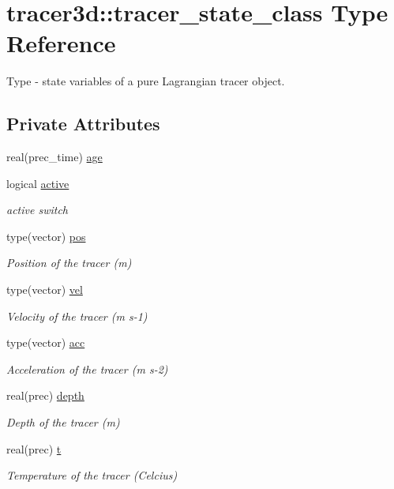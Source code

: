\hypertarget{structtracer3d_1_1tracer__state__class}{}\section{tracer3d\+:\+:tracer\+\_\+state\+\_\+class Type Reference}
\label{structtracer3d_1_1tracer__state__class}


Type -\/ state variables of a pure Lagrangian tracer object.  


\subsection*{Private Attributes}
\begin{DoxyCompactItemize}
\item 
real(prec\+\_\+time) \mbox{\hyperlink{structtracer3d_1_1tracer__state__class_af6fed1305d203d1081664934e2d6bcbc}{age}}
\item 
logical \mbox{\hyperlink{structtracer3d_1_1tracer__state__class_a8651aaf59c074ff965f0bf1d783fa574}{active}}
\begin{DoxyCompactList}\small\item\em active switch \end{DoxyCompactList}\item 
type(vector) \mbox{\hyperlink{structtracer3d_1_1tracer__state__class_a25f9790ae2d566076ee53216bae4305c}{pos}}
\begin{DoxyCompactList}\small\item\em Position of the tracer (m) \end{DoxyCompactList}\item 
type(vector) \mbox{\hyperlink{structtracer3d_1_1tracer__state__class_a4cb6681f1a9d48fbe5c2fc6f0808cdb5}{vel}}
\begin{DoxyCompactList}\small\item\em Velocity of the tracer (m s-\/1) \end{DoxyCompactList}\item 
type(vector) \mbox{\hyperlink{structtracer3d_1_1tracer__state__class_aad155c188002bd9560151d9f8216ea39}{acc}}
\begin{DoxyCompactList}\small\item\em Acceleration of the tracer (m s-\/2) \end{DoxyCompactList}\item 
real(prec) \mbox{\hyperlink{structtracer3d_1_1tracer__state__class_a0f8b523edbed09e372976f6cd1f6050a}{depth}}
\begin{DoxyCompactList}\small\item\em Depth of the tracer (m) \end{DoxyCompactList}\item 
real(prec) \mbox{\hyperlink{structtracer3d_1_1tracer__state__class_a0b11fa789fa23c2c183b93f320fe854e}{t}}
\begin{DoxyCompactList}\small\item\em Temperature of the tracer (Celcius) \end{DoxyCompactList}\end{DoxyCompactItemize}


